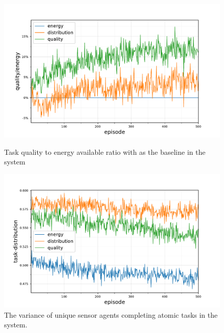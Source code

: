 \begin{figure}[ht]
	\begin{minipage}{.49\textwidth}
		\centering
		\includegraphics[width=1.0\linewidth,trim={25pt 0pt 50pt 0pt},clip]{5.19_ctv-quality-energy-baseline-comparison}
		\caption{Task quality to energy available ratio   with \newline \algorithmEnergy{}{} as the baseline in the \simulationExtended{}{} system}
		\label{fig:extended_quality_energy}
	\end{minipage}\hfill%
	\begin{minipage}{.49\textwidth}
	\centering
	\includegraphics[width=1.0\linewidth,trim={25pt 0pt 50pt 0pt},clip]{5.19_ctv-task-distribution-comparison}
	\caption{The variance of unique sensor agents completing \newline atomic tasks  in the \simulationExtended{}{} system.}
		\label{fig:extended_task_distribution}
\end{minipage}
\end{figure}

